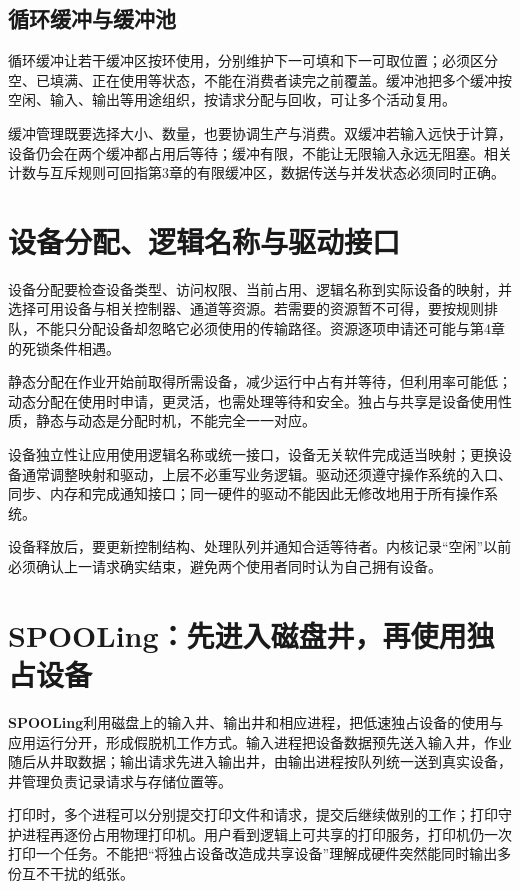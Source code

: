 \subsection{循环缓冲与缓冲池}\label{os-c07-h85}

循环缓冲让若干缓冲区按环使用，分别维护下一可填和下一可取位置；必须区分空、已填满、正在使用等状态，不能在消费者读完之前覆盖。缓冲池把多个缓冲按空闲、输入、输出等用途组织，按请求分配与回收，可让多个活动复用。

缓冲管理既要选择大小、数量，也要协调生产与消费。双缓冲若输入远快于计算，设备仍会在两个缓冲都占用后等待；缓冲有限，不能让无限输入永远无阻塞。相关计数与互斥规则可回指第3章的有限缓冲区，数据传送与并发状态必须同时正确。

\section{设备分配、逻辑名称与驱动接口}\label{os-7-6}

设备分配要检查设备类型、访问权限、当前占用、逻辑名称到实际设备的映射，并选择可用设备与相关控制器、通道等资源。若需要的资源暂不可得，要按规则排队，不能只分配设备却忽略它必须使用的传输路径。资源逐项申请还可能与第4章的死锁条件相遇。

静态分配在作业开始前取得所需设备，减少运行中占有并等待，但利用率可能低；动态分配在使用时申请，更灵活，也需处理等待和安全。独占与共享是设备使用性质，静态与动态是分配时机，不能完全一一对应。

设备独立性让应用使用逻辑名称或统一接口，设备无关软件完成适当映射；更换设备通常调整映射和驱动，上层不必重写业务逻辑。驱动还须遵守操作系统的入口、同步、内存和完成通知接口；同一硬件的驱动不能因此无修改地用于所有操作系统。

设备释放后，要更新控制结构、处理队列并通知合适等待者。内核记录``空闲''以前必须确认上一请求确实结束，避免两个使用者同时认为自己拥有设备。

\section{SPOOLing：先进入磁盘井，再使用独占设备}\label{os-7-7}

\textbf{SPOOLing}利用磁盘上的输入井、输出井和相应进程，把低速独占设备的使用与应用运行分开，形成假脱机工作方式。输入进程把设备数据预先送入输入井，作业随后从井取数据；输出请求先进入输出井，由输出进程按队列统一送到真实设备，井管理负责记录请求与存储位置等。

打印时，多个进程可以分别提交打印文件和请求，提交后继续做别的工作；打印守护进程再逐份占用物理打印机。用户看到逻辑上可共享的打印服务，打印机仍一次打印一个任务。不能把``将独占设备改造成共享设备''理解成硬件突然能同时输出多份互不干扰的纸张。

